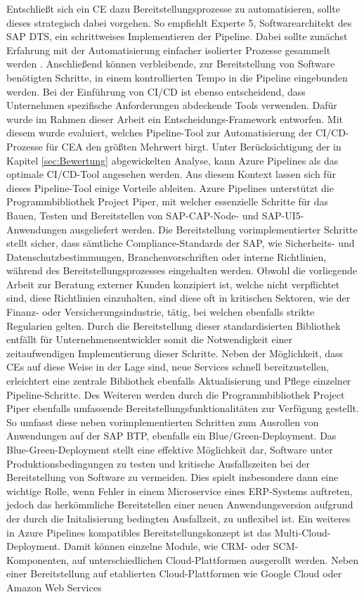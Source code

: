 \vspace*{-15mm} 
Entschließt sich ein CE dazu Bereitstellungsprozesse zu automatisieren, sollte dieses strategisch dabei vorgehen. So empfiehlt Experte 5, Softwarearchitekt des SAP DTS, ein schrittweises Implementieren der Pipeline. Dabei sollte zunächst Erfahrung mit der Automatisierung einfacher isolierter Prozesse gesammelt werden \cite[Z. 8 ff.]{SoftwareArchitektSAPDTSIntegration.}. Anschließend können verbleibende, zur Bereitstellung von Software benötigten Schritte, in einem kontrollierten Tempo in die Pipeline eingebunden werden. Bei der Einführung von CI/CD ist ebenso entscheidend, dass Unternehmen spezifische Anforderungen abdeckende Tools verwenden. Dafür wurde im Rahmen dieser Arbeit ein Entscheidungs-Framework entworfen. Mit diesem wurde evaluiert, welches Pipeline-Tool zur Automatisierung der CI/CD-Prozesse für CEA den größten Mehrwert birgt. Unter Berücksichtigung der in Kapitel \ref{sec:Bewertung} abgewickelten Analyse, kann Azure Pipelines als das optimale CI/CD-Tool angesehen werden. Aus diesem Kontext lassen sich für dieses Pipeline-Tool einige Vorteile ableiten. Azure Pipelines unterstützt die Programmbibliothek Project Piper, mit welcher essenzielle Schritte für das Bauen, Testen und Bereitstellen von SAP-CAP-Node- und SAP-UI5-Anwendungen ausgeliefert werden. Die Bereitstellung vorimplementierter Schritte stellt sicher, dass sämtliche Compliance-Standards der SAP, wie Sicherheits- und Datenschutzbestimmungen, Branchenvorschriften oder interne Richtlinien, während des Bereitstellungsprozesses eingehalten werden. Obwohl die vorliegende Arbeit zur Beratung externer Kunden konzipiert ist, welche nicht verpflichtet sind, diese Richtlinien einzuhalten, sind diese oft in kritischen Sektoren, wie der Finanz- oder Versicherungsindustrie, tätig, bei welchen ebenfalls strikte Regularien gelten. Durch die Bereitstellung dieser standardisierten Bibliothek entfällt für Unternehmensentwickler somit die Notwendigkeit einer zeitaufwendigen Implementierung dieser Schritte. Neben der Möglichkeit, dass CEs auf diese Weise in der Lage sind, neue Services schnell bereitzustellen, erleichtert eine zentrale Bibliothek ebenfalls Aktualisierung und Pflege einzelner Pipeline-Schritte. Des Weiteren werden durch die Programmbibliothek Project Piper ebenfalls umfassende Bereitstellungsfunktionalitäten zur Verfügung gestellt. So umfasst diese neben vorimplementierten Schritten zum Ausrollen von Anwendungen auf der SAP BTP, ebenfalls ein Blue/Green-Deployment. Das Blue-Green-Deployment stellt eine effektive Möglichkeit dar, Software unter Produktionsbedingungen zu testen und kritische Ausfallszeiten bei der Bereitstellung von Software zu vermeiden. Dies spielt insbesondere dann eine wichtige Rolle, wenn Fehler in einem Microservice eines ERP-Systems auftreten, jedoch das herkömmliche Bereitstellen einer neuen Anwendungsversion aufgrund der durch die Initalisierung bedingten Ausfallzeit, zu unflexibel ist. Ein weiteres in Azure Pipelines kompatibles Bereitstellungskonzept ist das Multi-Cloud-Deployment. Damit können einzelne Module, wie CRM- oder SCM-Komponenten, auf unterschiedlichen Cloud-Plattformen ausgerollt werden. Neben einer Bereitstellung auf etablierten Cloud-Plattformen wie Google Cloud oder Amazon Web Services 